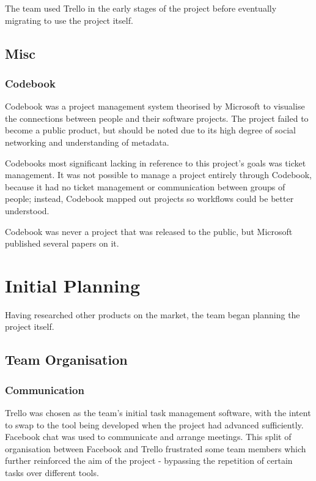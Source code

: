 \documentclass[a4paper]{l3proj}
\begin{document}
The team used Trello in the early stages of the project before eventually migrating to use the project itself.

\section{Misc}

\subsection{Codebook}
\label{codebook}
Codebook \cite{site:codebook} was a project management system theorised by Microsoft to visualise the connections between people and their software projects. The project failed to become a public product, but should be noted due to its high degree of social networking and understanding of metadata.

Codebooks most significant lacking in reference to this project’s goals was ticket management. It was not possible to manage a project entirely through Codebook, because it had no ticket management or communication between groups of people; instead, Codebook mapped out projects so workflows could be better understood.

Codebook was never a project that was released to the public, but Microsoft published several papers on it.

\chapter{Initial Planning}
\label{initialPlanning}
Having researched other products on the market, the team began planning the project itself. 

\section{Team Organisation}
\label{organisation}



\subsection{Communication}
\label{communication}
Trello \cite{site:ourTrello} was chosen as the team's initial task management software, with the intent to swap to the tool being developed when the project had advanced sufficiently. Facebook chat was used to communicate and arrange meetings.  This split of organisation between Facebook and Trello frustrated some team members which further reinforced the aim of the project - bypassing the repetition of certain tasks over different tools.
\end{document}
